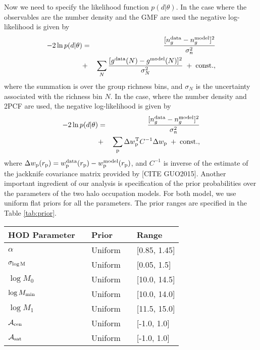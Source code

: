 \documentclass[12pt, preprint]{emulateapj}
\newcommand{\wpp}{w_{\rm p}}
\newcommand{\rpp}{r_{\rm p}}
\newcommand{\mzero}{\log M_{0}}
\newcommand{\mone}{\log M_{1}}
\newcommand{\mmin}{\log M_{\rm min}}
\newcommand{\sigmam}{\sigma_{\log \rm M}}
\newcommand{\acen}{\mathcal{A}_{\rm cen}}
\newcommand{\asat}{\mathcal{A}_{\rm sat}}
\begin{document}
Now we need to specify the likelihood function $p(d|\theta)$. In the case where the observables are the number density and the GMF are used the negative log-likelihood is given by
\begin{eqnarray}
-2\ln p(d|\theta) &=& \frac{[n^{\rm data}_{g}-n^{\rm model}_{g}]^{2}}{\sigma_{n}^{2}} \nonumber \\ &+& \sum_{N} \frac{[ g^{\rm data}(N)-g^{\rm model}(N)]^{2}}{\sigma^{2}_{N}} \; + \; \rm{const.},
\label{eq:lnlike_group}
\end{eqnarray}
where the summation is over the group richness bins, and $\sigma_{N}$ is the uncertainty associated with the richness bin $N$. In the case, where the number density and 2PCF are used, the negative log-likelihood is given by
\begin{eqnarray}
-2\ln p(d|\theta) &=& \frac{[n^{\rm data}_{g}-n^{\rm model}_{g}]^{2}}{\sigma_{n}^{2}} \nonumber \\  
&+&  \sum_{\rm p} \Delta \wpp^{\rm T}C^{-1}\Delta \wpp \; + \; \rm{const.},
\label{eq:lnlike_wp}
\end{eqnarray}
where $\Delta \wpp(\rpp) = \wpp^{\rm data}(\rpp)-\wpp^{\rm model}(\rpp)$, and  $C^{-1}$ is inverse of the estimate of the jackknife covariance matrix provided by [CITE GUO2015]. 
Another important ingredient of our analysis is specification of the prior probabilities over the parameters of the two halo occupation models. For both model, we use uniform flat priors for all the parameters. The prior ranges are specified in the Table \ref{tab:prior}. 

\begin{table*}
\begin{center}
  \label{tab:prior}
  \caption{{\bf Prior Specifications}: The prior probability distribution 
  and its range for each of the parameters. 
  All mass parameters are in unit of $h^{-1}M_\odot$. The first five rows are the only parameters of the standard HOD modeling.}
\begin{tabular}{@{}lllll}
\\ \hline 
    HOD Parameter & & Prior & & Range \\ \hline
  $\alpha$ & & Uniform & & [0.85, 1.45] \\
  $\sigmam$ & & Uniform & &  [0.05, 1.5] \\
   $\mzero$   & & Uniform & &  [10.0, 14.5] \\
  $\mmin$ & &   Uniform & &  [10.0, 14.0] \\
  $\mone$ & & Uniform & & [11.5, 15.0] \\ 
  $\acen$ & & Uniform & & [-1.0, 1.0] \\
  $\asat$ & & Uniform & & [-1.0, 1.0] \\
 \hline
  \end{tabular}
\end{center}
\end{table*}
\end{document}
